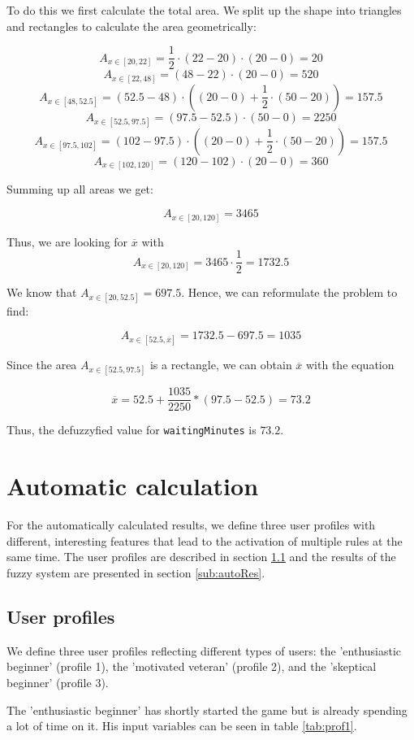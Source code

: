 To do this we first calculate the total area. We split up the shape into triangles and rectangles to calculate the area geometrically:

\[ A_{x \in [20,22]} = \frac{1}{2} \cdot (22-20) \cdot (20-0) = 20 \]
\[ A_{x \in [22,48]} = (48-22) \cdot (20-0) = 520 \]
\[ A_{x \in [48,52.5]} = (52.5-48) \cdot ((20-0) + \frac{1}{2}\cdot(50-20) ) = 157.5 \]
\[ A_{x \in [52.5,97.5]} = (97.5-52.5) \cdot (50-0) = 2250 \]
\[ A_{x \in [97.5,102]} = (102-97.5) \cdot ((20-0) + \frac{1}{2}\cdot(50-20) ) = 157.5 \]
\[ A_{x \in [102,120]} = (120-102) \cdot (20-0) = 360 \]

Summing up all areas we get:

\[ A_{x \in [20,120]} = 3465 \]

Thus, we are looking for $\overline{x}$ with 
\[ A_{x \in [20,120]} = 3465 \cdot \frac{1}{2} = 1732.5 \]

We know that $A_{x \in [20,52.5]}  = 697.5 $. Hence, we can reformulate the problem to find:

\[ A_{x \in [52.5,\overline{x}]} = 1732.5 - 697.5 = 1035 \]

Since the area $A_{x \in [52.5,97.5]}$ is a rectangle, we can obtain $\overline{x}$ with the equation 

\[ \overline{x} = 52.5 + \frac{1035}{2250} * (97.5-52.5) = 73.2 \]

Thus, the defuzzyfied value for \texttt{waitingMinutes} is $73.2$.

\section{Automatic calculation}

For the automatically calculated results, we define three user profiles with different, interesting features that lead to the activation of multiple rules at the same time. The user profiles are described in section \ref{sub:users} and the results of the fuzzy system are presented in section \ref{sub:autoRes}.

\subsection{User profiles}
\label{sub:users}

We define three user profiles reflecting different types of users: the 'enthusiastic beginner' (profile 1), the 'motivated veteran' (profile 2), and the 'skeptical beginner' (profile 3).

The 'enthusiastic beginner' has shortly started the game but is already spending a lot of time on it. His input variables can be seen in table \ref{tab:prof1}.

